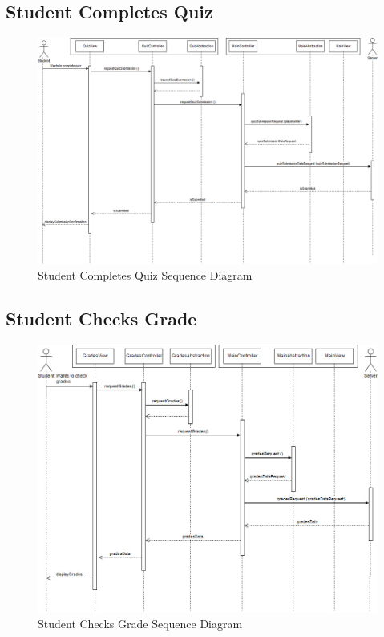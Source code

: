 \documentclass[]{article}
\begin{document}
\subsection{Student Completes Quiz}
{
\begin{figure}[H]
  \centering
  \includegraphics[scale=0.3]{A3_Assets/StudentCompletesQuiz.jpg}
  \caption{Student Completes Quiz Sequence Diagram}
\end{figure}
}

\subsection{Student Checks Grade}
{
\begin{figure}[H]
  \centering
  \includegraphics[scale=0.3]{A3_Assets/StudentChecksGrades.jpg}
  \caption{Student Checks Grade Sequence Diagram}
\end{figure}
}
\end{document}
